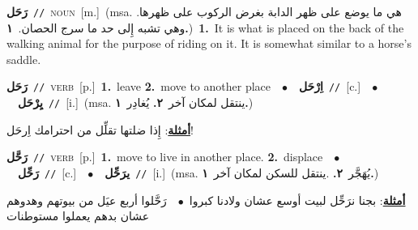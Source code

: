 \documentclass[10pt,a4paper,twoside]{article} %
\begin{document}
\begin{multicols}{2}
{\setlength\topsep{0pt}\textbf{\foreignlanguage{arabic}{رَحَل}}\ {\color{gray}\texttt{//}\color{black}}\ \textsc{noun}\ [m.]\ \color{gray}(msa. \foreignlanguage{arabic}{هي ما يوضع على ظهر الدابة بغرض الركوب على ظهرها. وهي تشبه إِلى حد ما سرج الحصان.}~\foreignlanguage{arabic}{\textbf{١.}})\color{black}\ \textbf{1.}~It is what is placed on the back of the walking animal for the purpose of riding on it. It is somewhat similar to a horse's saddle.\ } \vspace{2mm}

{\setlength\topsep{0pt}\textbf{\foreignlanguage{arabic}{رَحَل}}\ {\color{gray}\texttt{//}\color{black}}\ \textsc{verb}\ [p.]\ \textbf{1.}~leave  \textbf{2.}~move to another place\ \ $\bullet$\ \ \setlength\topsep{0pt}\textbf{\foreignlanguage{arabic}{اِرْحَل}}\ {\color{gray}\texttt{//}\color{black}}\ [c.]\ \ $\bullet$\ \ \setlength\topsep{0pt}\textbf{\foreignlanguage{arabic}{يِرْحَل}}\ {\color{gray}\texttt{//}\color{black}}\ [i.]\ \color{gray}(msa. \foreignlanguage{arabic}{ينتقل لمكان آخر}~\foreignlanguage{arabic}{\textbf{٢.}}  \foreignlanguage{arabic}{يُغادِر}~\foreignlanguage{arabic}{\textbf{١.}})\color{black}\  \begin{flushright}\color{gray}\foreignlanguage{arabic}{\textbf{\underline{\foreignlanguage{arabic}{أمثلة}}}: إِذا ضلتها تقلِّل من احترامك اِرحَل!}\end{flushright}\color{black}} \vspace{2mm}

{\setlength\topsep{0pt}\textbf{\foreignlanguage{arabic}{رَحَّل}}\ {\color{gray}\texttt{//}\color{black}}\ \textsc{verb}\ [p.]\ \textbf{1.}~move to live in another place.  \textbf{2.}~displace\ \ $\bullet$\ \ \setlength\topsep{0pt}\textbf{\foreignlanguage{arabic}{رَحِّل}}\ {\color{gray}\texttt{//}\color{black}}\ [c.]\ \ $\bullet$\ \ \setlength\topsep{0pt}\textbf{\foreignlanguage{arabic}{يرَحِّل}}\ {\color{gray}\texttt{//}\color{black}}\ [i.]\ \color{gray}(msa. \foreignlanguage{arabic}{يُهَجَّر}~\foreignlanguage{arabic}{\textbf{٢.}}  .\foreignlanguage{arabic}{ينتقل للسكن لمكان آخر}~\foreignlanguage{arabic}{\textbf{١.}})\color{black}\  \begin{flushright}\color{gray}\foreignlanguage{arabic}{\textbf{\underline{\foreignlanguage{arabic}{أمثلة}}}: بجنا نرَحِّل لبيت أوسع عشان ولادنا كبروا\ $\bullet$\ \  رَحَّلوا أربع عيَل من بيوتهم وهدوهم عشان بدهم يعملوا مستوطنات}\end{flushright}\color{black}} \vspace{2mm}


\end{multicols}
\end{document}
